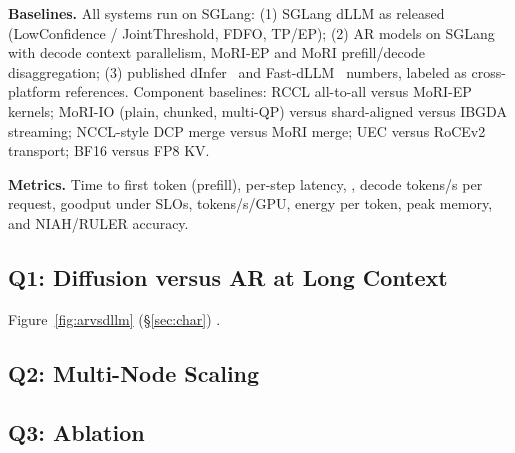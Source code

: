 \textbf{Baselines.} All systems run on SGLang: (1) SGLang dLLM as released (LowConfidence /
JointThreshold, FDFO, TP/EP); (2) AR models on SGLang with decode context parallelism, MoRI-EP and
MoRI prefill/decode disaggregation; (3) published dInfer~\cite{ma2025dinfer} and
Fast-dLLM~\cite{wu2025fastdllm} numbers, labeled as cross-platform references.
Component baselines: RCCL all-to-all versus MoRI-EP kernels; MoRI-IO (plain, chunked, multi-QP)
versus shard-aligned versus IBGDA streaming; NCCL-style DCP merge versus MoRI merge; UEC versus
RoCEv2 transport; BF16 versus FP8 KV.

\textbf{Metrics.} Time to first token (prefill), per-step latency, \TPF, decode tokens/s per request,
goodput under SLOs, tokens/s/GPU, energy per token, peak memory, and NIAH/RULER accuracy.

\subsection{Q1: Diffusion versus AR at Long Context}
Figure~\ref{fig:arvsdllm} (\S\ref{sec:char}) .

\subsection{Q2: Multi-Node Scaling}

\subsection{Q3: Ablation}

